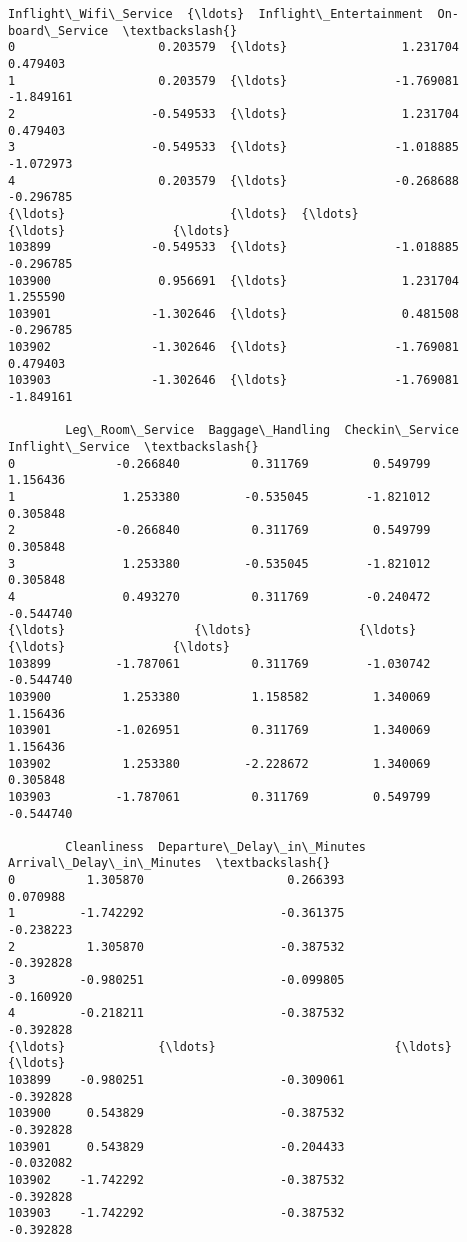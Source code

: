 \documentclass[11pt]{article}
\begin{document}
\begin{tcolorbox}[breakable, size=fbox, boxrule=.5pt, pad at break*=1mm, opacityfill=0]
\begin{Verbatim}[commandchars=\\\{\}]
        Inflight\_Wifi\_Service  {\ldots}  Inflight\_Entertainment  On-board\_Service  \textbackslash{}
0                    0.203579  {\ldots}                1.231704          0.479403
1                    0.203579  {\ldots}               -1.769081         -1.849161
2                   -0.549533  {\ldots}                1.231704          0.479403
3                   -0.549533  {\ldots}               -1.018885         -1.072973
4                    0.203579  {\ldots}               -0.268688         -0.296785
{\ldots}                       {\ldots}  {\ldots}                     {\ldots}               {\ldots}
103899              -0.549533  {\ldots}               -1.018885         -0.296785
103900               0.956691  {\ldots}                1.231704          1.255590
103901              -1.302646  {\ldots}                0.481508         -0.296785
103902              -1.302646  {\ldots}               -1.769081          0.479403
103903              -1.302646  {\ldots}               -1.769081         -1.849161

        Leg\_Room\_Service  Baggage\_Handling  Checkin\_Service  Inflight\_Service  \textbackslash{}
0              -0.266840          0.311769         0.549799          1.156436
1               1.253380         -0.535045        -1.821012          0.305848
2              -0.266840          0.311769         0.549799          0.305848
3               1.253380         -0.535045        -1.821012          0.305848
4               0.493270          0.311769        -0.240472         -0.544740
{\ldots}                  {\ldots}               {\ldots}              {\ldots}               {\ldots}
103899         -1.787061          0.311769        -1.030742         -0.544740
103900          1.253380          1.158582         1.340069          1.156436
103901         -1.026951          0.311769         1.340069          1.156436
103902          1.253380         -2.228672         1.340069          0.305848
103903         -1.787061          0.311769         0.549799         -0.544740

        Cleanliness  Departure\_Delay\_in\_Minutes  Arrival\_Delay\_in\_Minutes  \textbackslash{}
0          1.305870                    0.266393                  0.070988
1         -1.742292                   -0.361375                 -0.238223
2          1.305870                   -0.387532                 -0.392828
3         -0.980251                   -0.099805                 -0.160920
4         -0.218211                   -0.387532                 -0.392828
{\ldots}             {\ldots}                         {\ldots}                       {\ldots}
103899    -0.980251                   -0.309061                 -0.392828
103900     0.543829                   -0.387532                 -0.392828
103901     0.543829                   -0.204433                 -0.032082
103902    -1.742292                   -0.387532                 -0.392828
103903    -1.742292                   -0.387532                 -0.392828


\end{Verbatim}
\end{tcolorbox}
\end{document}

